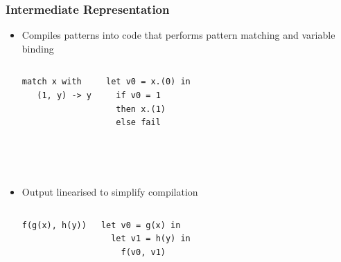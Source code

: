 \documentclass{beamer}
\begin{document}
\begin{frame}[fragile]  \frametitle{Intermediate Representation}
\begin{itemize}
\item Compiles patterns into code that performs pattern matching and variable binding

\begin{columns}[c] %
\begin{verbatim}
match x with
   (1, y) -> y


\end{verbatim}

\begin{verbatim}
let v0 = x.(0) in
  if v0 = 1
  then x.(1)
  else fail
\end{verbatim}
\end{columns} %
\text{} \\
\text{} \\

\item Output linearised to simplify compilation %

\begin{columns}[c] 
\begin{verbatim}
f(g(x), h(y))


\end{verbatim}
\begin{verbatim}
let v0 = g(x) in
  let v1 = h(y) in 
    f(v0, v1)
\end{verbatim}
\end{columns}
\end{itemize}
\end{frame}

\end{document}
